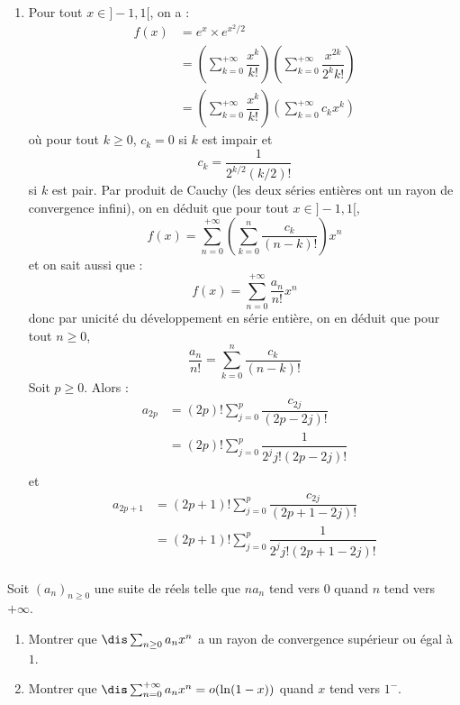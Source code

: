 \documentclass[a4paper,10pt]{report}
\begin{document}
\begin{enumerate}
\item Pour tout $x \in ]-1,1[$, on a :
\begin{align*}
f(x) & = e^x \times e^{x^2/2} \\
& = \left( \sum_{k=0}^{+ \infty} \dfrac{x^k}{k!} \right) \left( \sum_{k=0}^{+ \infty} \dfrac{x^{2k}}{2^k k!} \right)  \\
& = \left( \sum_{k=0}^{+ \infty} \dfrac{x^k}{k!} \right) \left( \sum_{k=0}^{+ \infty} c_k x^k \right)  
\end{align*}
où pour tout $k \geq 0$, $c_k=0$ si $k$ est impair et 
$$ c_k = \dfrac{1}{2^{k/2} (k/2)!}$$
si $k$ est pair. Par produit de Cauchy (les deux séries entières ont un rayon de convergence infini), on en déduit que pour tout $x \in ]-1,1[$,
$$ f(x) = \sum_{n=0}^{+ \infty} \left(\sum_{k=0}^n \dfrac{c_k}{(n-k)!} \right) x^n$$
et on sait aussi que :
$$ f(x) = \sum_{n=0}^{+ \infty} \dfrac{a_n}{n!} x^n$$
donc par unicité du développement en série entière, on en déduit que pour tout $n \geq 0$,
$$\dfrac{a_n}{n!} = \sum_{k=0}^n \dfrac{c_k}{(n-k)!}$$
Soit $p \geq 0$. Alors :
\begin{align*}
a_{2p} & = (2p)! \sum_{j=0}^p \dfrac{c_{2j}}{(2p-2j)!} \\
& = (2p)! \sum_{j=0}^p \dfrac{1}{2^j j! (2p-2j)!} \\
\end{align*}
et 
\begin{align*}
a_{2p+1} & = (2p+1)! \sum_{j=0}^p \dfrac{c_{2j}}{(2p+1-2j)!} \\
& = (2p+1)! \sum_{j=0}^p \dfrac{1}{2^j j! (2p+1-2j)!} \\
\end{align*}
\end{enumerate}

\begin{Exa}[\ding{80}] Soit $(a_n)_{n \geq 0}$ une suite de réels telle que $na_n$ tend vers $0$ quand $n$ tend vers $+ \infty$.
\begin{enumerate}
\item Montrer que $\dis \sum_{n \geq 0} a_n x^n$ a un rayon de convergence supérieur ou égal à $1$.
\item Montrer que $\dis \sum_{n=0}^{+ \infty} a_n x^n = o(\ln(1-x))$ quand $x$ tend vers $1^{-}$.
\end{enumerate}
\end{Exa}
\end{document}

